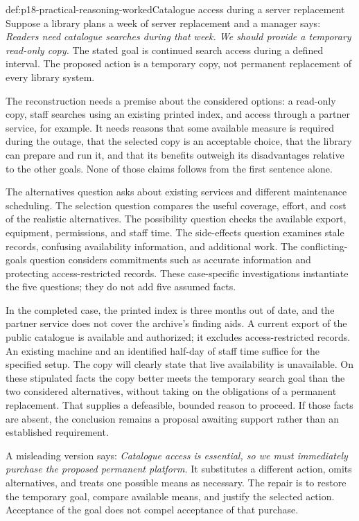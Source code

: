 \begin{hbexample}{def:p18-practical-reasoning-worked}{Catalogue access during a server replacement}
Suppose a library plans a week of server replacement and a manager says:
\emph{Readers need catalogue searches during that week. We should
provide a temporary read-only copy.}
The stated goal is continued search access during a defined interval.
The proposed action is a temporary copy, not permanent replacement
of every library system.

The reconstruction needs a premise about the considered options:
a read-only copy, staff searches using an existing printed index,
and access through a partner service, for example.
It needs reasons that some available measure is required during the
outage, that the selected copy is an acceptable choice, that the
library can prepare and run it, and that its benefits outweigh its
disadvantages relative to the other goals.
None of those claims follows from the first sentence alone.

The alternatives question asks about existing services and different
maintenance scheduling. The selection question compares the useful
coverage, effort, and cost of the realistic alternatives.
The possibility question checks the available export, equipment,
permissions, and staff time. The side-effects question examines stale
records, confusing availability information, and additional work.
The conflicting-goals question considers commitments such as accurate
information and protecting access-restricted records.
These case-specific investigations instantiate the five questions;
they do not add five assumed facts.

In the completed case, the printed index is three months out of date,
and the partner service does not cover the archive's finding aids.
A current export of the public catalogue is available and authorized;
it excludes access-restricted records. An existing machine and an
identified half-day of staff time suffice for the specified setup.
The copy will clearly state that live availability is unavailable.
On these stipulated facts the copy better meets the temporary search
goal than the two considered alternatives, without taking on the
obligations of a permanent replacement.
That supplies a defeasible, bounded reason to proceed.
If those facts are absent, the conclusion remains a proposal awaiting
support rather than an established requirement.

A misleading version says:
\emph{Catalogue access is essential, so we must immediately purchase
the proposed permanent platform.}
It substitutes a different action, omits alternatives, and treats one
possible means as necessary. The repair is to restore the temporary
goal, compare available means, and justify the selected action.
Acceptance of the goal does not compel acceptance of that purchase.
\end{hbexample}

